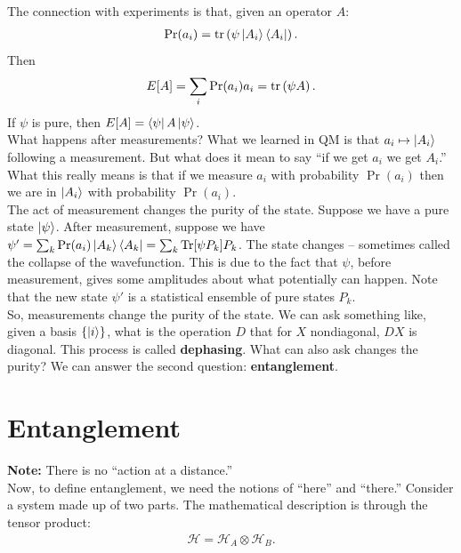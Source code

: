 \documentclass{book}
\theoremstyle{definition}
\newcommand{\had}{\mathcal{H}}
\newcommand{\lp}{\left(}
\newcommand{\rp}{\right)}
\begin{document}
The connection with experiments is that, given an operator $A$:
\begin{align}
\Pr(a_i) = \tr\lp \psi \ket{A_i}\bra{A_i} \rp.
\end{align}
Then 
\begin{align}
E[A] = \sum_i \Pr(a_i) a_i = \tr\lp \psi A \rp.
\end{align}
If $\psi$ is pure, then $E[A] = \bra{\psi} A \ket{\psi}$.\\

What happens after measurements? What we learned in QM is that $a_i \mapsto \ket{A_i}$ following a measurement. But what does it mean to say ``if we get $a_i$ we get $A_i$.'' What this really means is that if we measure $a_i$ with probability $\Pr(a_i)$ then we are in $\ket{A_i}$ with probability $\Pr(a_i)$.\\

The act of measurement changes the purity of the state. Suppose we have a pure state $\ket{\psi}$. After measurement, suppose we have $\psi' = \sum_k \Pr(a_i)\ket{A_k}\bra{A_k} = \sum_k \Tr[\psi P_k]P_k$. The state changes -- sometimes called the collapse of the wavefunction. This is due to the fact that $\psi$, before measurement, gives some amplitudes about what potentially can happen. Note that the new state $\psi'$ is a statistical ensemble of pure states $P_k$.\\

So, measurements change the purity of the state. We can ask something like, given a basis $\{ \ket{i}  \}$, what is the operation $D$ that for $X$ nondiagonal, $DX$ is diagonal. This process is called \textbf{dephasing}. What can also ask changes the purity? We can answer the second question: \textbf{entanglement}. 








\newpage

\section{Entanglement}

\textbf{Note:} There is no ``action at a distance.''\\

Now, to define entanglement, we need the notions of ``here'' and ``there.'' Consider a system made up of two parts. The mathematical description is through the tensor product:
\begin{align}
\had = \had_A \otimes \had_B.
\end{align}
\end{document}
